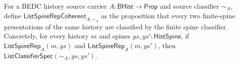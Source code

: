 \begin{definition}
\label{def:list-spine-rep-coherence}
For a BEDC history source carrier $A:\mathsf{BHist}\to\mathsf{Prop}$ and
source classifier $\sim_A$, define
$\mathsf{ListSpineRepCoherent}_{A,\sim_A}$ as the proposition that every two
finite-spine presentations of the same history are classified by the finite
spine classifier. Concretely, for every history $m$ and spines $ys,ys':\mathsf{HistSpine}$,
if $\mathsf{ListSpineRep}_A(m,ys)$ and $\mathsf{ListSpineRep}_A(m,ys')$, then
$\mathsf{ListClassifierSpec}(\sim_A,ys,ys')$.
\end{definition}
